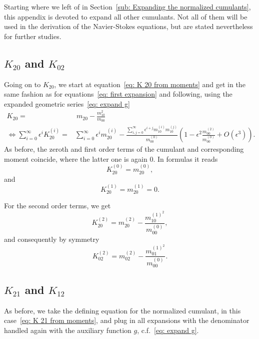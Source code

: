 Starting where we left of in Section~\eqref{sub: Expanding the normalized cumulants}, this appendix is devoted to expand all other cumulants.
Not all of them will be used in the derivation of the Navier-Stokes equations, but are stated nevertheless for further studies.

\subsection{\texorpdfstring{$K_{20}$}{K 20} and \texorpdfstring{$K_{02}$}{K 02}}
\label{sub: K 20}
Going on to $K_{20}$, we start at equation~\eqref{eq: K 20 from moments} and get in the same fashion as for equations~\eqref{eq: first expansion} and following, using the expanded geometric series~\eqref{eq: expand g}
\begin{equation*}
  \begin{aligned}
    K_{20}  = &\ m_{20} - \frac{m_{10}^2}{m_{00}}\\
    \Leftrightarrow
    \sum_{i=0}^\infty \epsilon^i K_{20}^{(i)}
    =& \sum_{i=0}^\infty \epsilon^i m_{20}^{(i)}
    - \frac{\sum_{i,j=0}^\infty \epsilon^{i+j} m_{10}^{(i)}m_{10}^{(j)}}
        {m_{00}^{(0)}}
    \left(1 - \epsilon^2 \frac{m_{00}^{(2)}}{m_{00}^{(0)}}  + O(\epsilon^3)\right).
  \end{aligned}
\end{equation*}
As before, the zeroth and first order terms of the cumulant and corresponding moment coincide, where the latter one is again $0$. In formulas it reads
\begin{equation*}
  K_{20}^{(0)} = m_{20}^{(0)},
\end{equation*}
and
\begin{equation*}
  K_{20}^{(1)} = m_{20}^{(1)} = 0.
\end{equation*}

For the second order terms, we get
\begin{equation*}
  K_{20}^{(2)} = m_{20}^{(2)} - \frac{ m_{10}^{{(1)}^2}}{m_{00}^{(0)}},
\end{equation*}
and consequently by symmetry
\begin{equation*}
  K_{02}^{(2)} = m_{02}^{(2)} - \frac{ m_{01}^{{(1)}^2}}{m_{00}^{(0)}}.
\end{equation*}

\subsection{\texorpdfstring{$K_{21}$}{K 21} and \texorpdfstring{$K_{12}$}{K 12}}
\label{sub: K 21}
As before, we take the defining equation for the normalized cumulant, in this case~\eqref{eq: K 21 from moments}, and plug in all expansions with the denominator handled again with the auxiliary function $g$, c.f.~\eqref{eq: expand g}.

